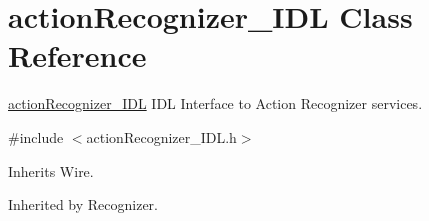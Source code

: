 \section{action\+Recognizer\+\_\+\+I\+DL Class Reference}
\label{classactionRecognizer__IDL}


\hyperlink{classactionRecognizer__IDL}{action\+Recognizer\+\_\+\+I\+DL} I\+DL Interface to Action Recognizer services.  




{\ttfamily \#include $<$action\+Recognizer\+\_\+\+I\+D\+L.\+h$>$}



Inherits Wire.



Inherited by Recognizer.

